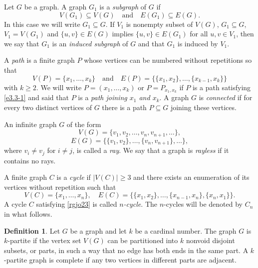 \documentclass[11pt]{article}
\theoremstyle{definition}
\newtheorem{definition}[theorem]{Definition}
\theoremstyle{remark}
\numberwithin{equation}{section}
\begin{document}
Let $G$ be a graph.
A graph \(G_1\) is a \emph{subgraph} of \(G\) if
\[
V(G_1) \subseteq V(G) \quad \text{and} \quad E(G_1) \subseteq E(G).
\]
In this case we will write \(G_1 \subseteq G\). If $V_1$ is  nonempty subset of $V(G)$, $G_1 \subseteq G$, $V_1 = V(G_1)$  
and $\{u,v\} \in E(G)$ implies
$\{u,v\} \in E(G_1)$ for all $u,v \in V_1$,  
then we say that $G_1$ is an \emph{induced subgraph} of $G$  
and that $G_1$ is induced by $V_1$.





A \emph{path} is a finite graph \(P\) whose vertices can be numbered without repetitions so that
\begin{equation}\label{e3.3-1}
V(P) = \{x_1, \ldots, x_k\} \quad \text{and} \quad E(P) = \{\{x_1, x_2\}, \ldots, \{x_{k-1}, x_k\}\}
\end{equation}
with \(k \geqslant 2\). We will write \(P = (x_1, \ldots, x_k)\) or \(P = P_{x_1, x_k}\) if \(P\) is a path satisfying \eqref{e3.3-1} and said that \(P\) is a \emph{path joining \(x_1\) and \(x_k\)}. A graph \(G\) is \emph{connected} if for every two distinct vertices of \(G\) there is a path \(P \subseteq G\) joining these vertices.



An infinite graph $G$ of the form
\[
V(G) = \{v_1, v_2, \ldots, v_n, v_{n+1}, \ldots \},
\]
\[
E(G) = \{\{v_1,v_2\}, \ldots, \{v_n,v_{n+1}\}, \ldots \},
\]
where $v_i \neq v_j$ for $i \neq j$,
is called a {\it ray}. We say that a graph is {\it rayless} if it contains no rays.






A finite graph $C$ is a \textit{cycle} if $|V(C)|\geq 3$ and there exists an enumeration of its vertices without repetition such that 
\begin{equation}\label{rgjo23}
    V(C) = \{x_1, \ldots, x_n\}, \quad
E(C) = \{\{x_1, x_2\}, \ldots, \{x_{n-1}, x_n\}, \{x_n, x_1\}\}.
\end{equation}
A cycle $C$ satisfying \eqref{rgjo23} is called {\it $n$-cycle}. The $n$-cycles will be denoted by $C_n$ in what follows.








\begin{definition}\label{rfgyppo}
    Let $G $ be a graph and let $k$ be a cardinal number. The graph $G$ is $k$-partite if the vertex set $V (G)$ can be partitioned into $k$ nonvoid disjoint subsets, or parts, in such a way that no edge has both ends in the same part. A $k$-partite graph is complete if any two vertices in different parts are adjacent.
\end{definition}
\end{document}
